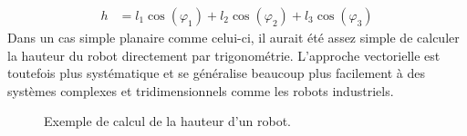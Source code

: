 \begin{align}
	h &= l_1 \cos (\varphi_1) + l_2 \cos (\varphi_2) + l_3 \cos (\varphi_3)
	\label{eq:vecaddprojphi}
\end{align}
Dans un cas simple planaire comme celui-ci, il aurait été assez simple de calculer la hauteur du robot directement par trigonométrie. L'approche vectorielle est toutefois plus systématique et se généralise beaucoup plus facilement à des systèmes complexes et tridimensionnels comme les robots industriels.
%
\begin{figure}[H]
	\centering
	\hspace{3pt}
	\hspace{3pt}
	\hspace{3pt}
	\caption{Exemple de calcul de la hauteur d'un robot.}
	\label{fig:vecposunipro}
\end{figure}



